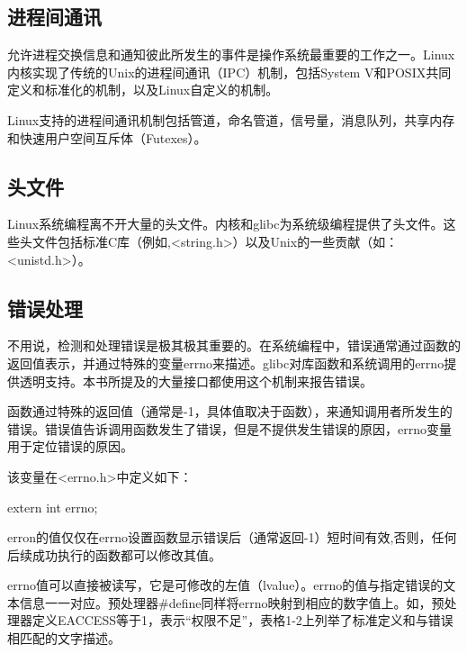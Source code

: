 \subsection{进程间通讯}

允许进程交换信息和通知彼此所发生的事件是操作系统最重要的工作之一。Linux内核实现了传统的Unix的进程间通讯（IPC）机制，包括System V和POSIX共同定义和标准化的机制，以及Linux自定义的机制。

Linux支持的进程间通讯机制包括管道，命名管道，信号量，消息队列，共享内存和快速用户空间互斥体（Futexes）。

\subsection{头文件}

Linux系统编程离不开大量的头文件。内核和glibc为系统级编程提供了头文件。这些头文件包括标准C库（例如,<string.h>）以及Unix的一些贡献（如：<unistd.h>）。

\subsection{错误处理}

不用说，检测和处理错误是极其极其重要的。在系统编程中，错误通常通过函数的返回值表示，并通过特殊的变量errno来描述。glibc对库函数和系统调用的errno提供透明支持。本书所提及的大量接口都使用这个机制来报告错误。

函数通过特殊的返回值（通常是-1，具体值取决于函数），来通知调用者所发生的错误。错误值告诉调用函数发生了错误，但是不提供发生错误的原因，errno变量用于定位错误的原因。


该变量在<errno.h>中定义如下：

extern int errno;

erron的值仅仅在errno设置函数显示错误后（通常返回-1）短时间有效,否则，任何后续成功执行的函数都可以修改其值。

errno值可以直接被读写，它是可修改的左值（lvalue）。errno的值与指定错误的文本信息一一对应。预处理器\#define同样将errno映射到相应的数字值上。如，预处理器定义EACCESS等于1，表示“权限不足”，表格1-2上列举了标准定义和与错误相匹配的文字描述。

